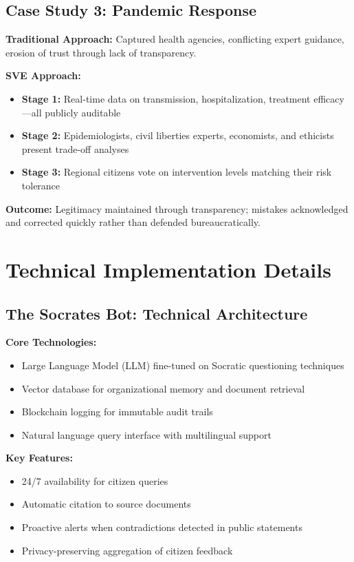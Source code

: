 \documentclass[11pt,a4paper]{article}
\begin{document}
\begin{small}
\subsection*{Case Study 3: Pandemic Response}

\textbf{Traditional Approach:} Captured health agencies, conflicting expert guidance, erosion of trust through lack of transparency.

\textbf{SVE Approach:}
\begin{itemize}[nosep]
    \item \textbf{Stage 1:} Real-time data on transmission, hospitalization, treatment efficacy—all publicly auditable
    \item \textbf{Stage 2:} Epidemiologists, civil liberties experts, economists, and ethicists present trade-off analyses
    \item \textbf{Stage 3:} Regional citizens vote on intervention levels matching their risk tolerance
\end{itemize}

\textbf{Outcome:} Legitimacy maintained through transparency; mistakes acknowledged and corrected quickly rather than defended bureaucratically.

\section{Technical Implementation Details}
\label{app:technical}

\subsection*{The Socrates Bot: Technical Architecture}

\textbf{Core Technologies:}
\begin{itemize}[nosep]
    \item Large Language Model (LLM) fine-tuned on Socratic questioning techniques
    \item Vector database for organizational memory and document retrieval
    \item Blockchain logging for immutable audit trails
    \item Natural language query interface with multilingual support
\end{itemize}

\textbf{Key Features:}
\begin{itemize}[nosep]
    \item 24/7 availability for citizen queries
    \item Automatic citation to source documents
    \item Proactive alerts when contradictions detected in public statements
    \item Privacy-preserving aggregation of citizen feedback
\end{itemize}


\end{small}
\end{document}

